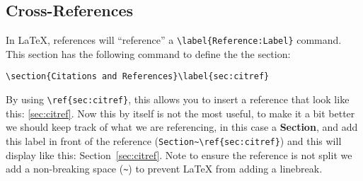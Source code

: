 		\subsection{Cross-References}\label{subsec:cross-reference}
			In \LaTeX{}, references will \enquote{reference} a \lstinline|\label{Reference:Label}| command. 
			This section has the following command to define the the section:
			\begin{Center}
				\lstinline|\section{Citations and References}\label{sec:citref}|
			\end{Center}
			By using \lstinline|\ref{sec:citref}|, this allows you to insert a reference that look like this: \ref{sec:citref}.
			Now this by itself is not the most useful, to make it a bit better we should keep track of what we are referencing, in this case a \textbf{Section}, and add this label in front of the reference (\lstinline|Section~\ref{sec:citref}|) and this will display like this: Section~\ref{sec:citref}.
			Note to ensure the reference is not split we add a non-breaking space (\lstinline|~|) to prevent \LaTeX{} from adding a linebreak.

